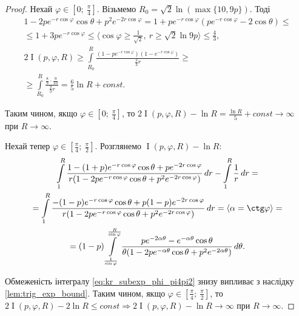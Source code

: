 \begin{lem}
\begin{proof}
Нехай $\varphi \in [0;~\frac{\pi}{4}]$. Візьмемо $R_{0} = \sqrt{2} \ln(\max\{10, 9p\})$. Тоді
\begin{gather*}
1 - 2p e^{-r\cos\varphi} \cos\theta + p^2 e^{-2r\cos\varphi} = 1 + p e^{-r\cos\varphi} (p e^{-r\cos\varphi} - 2 \cos\theta) \leq \\
\leq 1 + 3p e^{-r\cos\varphi} \leq \langle \cos\varphi \geq \frac{1}{\sqrt{2}}, ~ r \geq \sqrt{2} \ln 9p \rangle \leq \frac{4}{3}, \\
2\operatorname{I}(p, \varphi, R) \geq \int\limits_{R_{0}}^{R} \frac{(1 - p e^{-r\cos\varphi})(1-e^{-r\cos\varphi})}{\frac{2}{3}r} \geq \\ \geq \int\limits_{R_{0}}^{R} \frac{\frac{8}{9} \cdot \frac{9}{10}}{\frac{2}{3}r} = \frac{6}{5} \ln R + const.
\end{gather*}

Таким чином, якщо $\varphi \in [0;~\frac{\pi}{4}]$, то $2\operatorname{I}(p, \varphi, R) - \ln R = \frac{\ln R}{5} + const \rightarrow \infty$ при $R \rightarrow \infty$.

Нехай тепер $\varphi \in [\frac{\pi}{4};~\frac{\pi}{2}]$. Розглянемо $\operatorname{I}(p, \varphi, R) - \ln R$:
\begin{gather}
\int\limits_{1}^{R} \frac{1- (1+p)e^{-r \cos \varphi} \cos \theta + p e^{-2r \cos \varphi} }{r(1 - 2p e^{-r\cos\varphi} \cos\theta + p^2 e^{-2r\cos\varphi})}\,dr - \int\limits_{1}^{R} \frac{1}{r} \, dr = \notag \\
=\int\limits_{1}^{R} \frac{-(1-p)e^{-r \cos \varphi} \cos \theta + p(1-p) e^{-2r \cos \varphi} }{r(1 - 2p e^{-r\cos\varphi} \cos\theta + p^2 e^{-2r\cos\varphi})}\,dr = \langle \alpha = \ctg \varphi \rangle  =  \notag \\
= (1 - p) \int\limits_{\frac{1}{\sin \varphi}}^{\frac{R}{\sin\varphi}} \frac{p e^{-2 \alpha \theta} - e^{-\alpha \theta} \cos \theta }{\theta (1 - 2p e^{-\alpha\theta} \cos\theta + p^2 e^{-2\alpha\theta})}\,d\theta \label{eq:kr_subexp_phi_pi4pi2}.
\end{gather}

Обмеженість інтегралу \eqref{eq:kr_subexp_phi_pi4pi2} знизу випливає з наслідку \eqref{lem:trig_exp_bound}. Таким чином, якщо $\varphi \in [\frac{\pi}{4};~\frac{\pi}{2}]$, то $2\operatorname{I}(p, \varphi, R) - 2 \ln R \leq const \Rightarrow 2\operatorname{I}(p, \varphi, R) - \ln R \rightarrow \infty$ при $R \rightarrow \infty$. 


\end{proof}
\end{lem}
